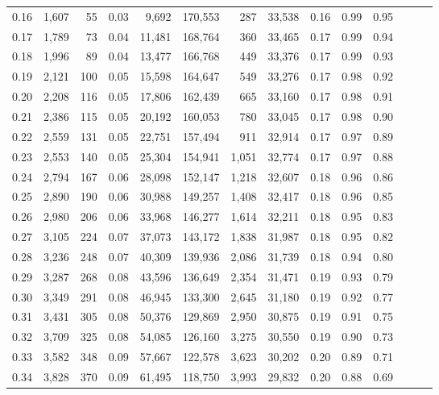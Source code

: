 \begin{tabular}{rrrrrrrrrrrrrr}
0.16 &  1,607 &   55 &  0.03 &    9,692 &  170,553 &     287 &  33,538 &  0.16 &  0.99 &      0.95 \\
0.17 &  1,789 &   73 &  0.04 &   11,481 &  168,764 &     360 &  33,465 &  0.17 &  0.99 &      0.94 \\
0.18 &  1,996 &   89 &  0.04 &   13,477 &  166,768 &     449 &  33,376 &  0.17 &  0.99 &      0.93 \\
0.19 &  2,121 &  100 &  0.05 &   15,598 &  164,647 &     549 &  33,276 &  0.17 &  0.98 &      0.92 \\
0.20 &  2,208 &  116 &  0.05 &   17,806 &  162,439 &     665 &  33,160 &  0.17 &  0.98 &      0.91 \\
0.21 &  2,386 &  115 &  0.05 &   20,192 &  160,053 &     780 &  33,045 &  0.17 &  0.98 &      0.90 \\
0.22 &  2,559 &  131 &  0.05 &   22,751 &  157,494 &     911 &  32,914 &  0.17 &  0.97 &      0.89 \\
0.23 &  2,553 &  140 &  0.05 &   25,304 &  154,941 &   1,051 &  32,774 &  0.17 &  0.97 &      0.88 \\
0.24 &  2,794 &  167 &  0.06 &   28,098 &  152,147 &   1,218 &  32,607 &  0.18 &  0.96 &      0.86 \\
0.25 &  2,890 &  190 &  0.06 &   30,988 &  149,257 &   1,408 &  32,417 &  0.18 &  0.96 &      0.85 \\
0.26 &  2,980 &  206 &  0.06 &   33,968 &  146,277 &   1,614 &  32,211 &  0.18 &  0.95 &      0.83 \\
0.27 &  3,105 &  224 &  0.07 &   37,073 &  143,172 &   1,838 &  31,987 &  0.18 &  0.95 &      0.82 \\
0.28 &  3,236 &  248 &  0.07 &   40,309 &  139,936 &   2,086 &  31,739 &  0.18 &  0.94 &      0.80 \\
0.29 &  3,287 &  268 &  0.08 &   43,596 &  136,649 &   2,354 &  31,471 &  0.19 &  0.93 &      0.79 \\
0.30 &  3,349 &  291 &  0.08 &   46,945 &  133,300 &   2,645 &  31,180 &  0.19 &  0.92 &      0.77 \\
0.31 &  3,431 &  305 &  0.08 &   50,376 &  129,869 &   2,950 &  30,875 &  0.19 &  0.91 &      0.75 \\
0.32 &  3,709 &  325 &  0.08 &   54,085 &  126,160 &   3,275 &  30,550 &  0.19 &  0.90 &      0.73 \\
0.33 &  3,582 &  348 &  0.09 &   57,667 &  122,578 &   3,623 &  30,202 &  0.20 &  0.89 &      0.71 \\
0.34 &  3,828 &  370 &  0.09 &   61,495 &  118,750 &   3,993 &  29,832 &  0.20 &  0.88 &      0.69 \\

\end{tabular}
